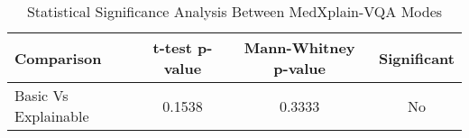 
\begin{table}[htbp]
\centering
\caption{Statistical Significance Analysis Between MedXplain-VQA Modes}
\label{tab:statistical_analysis}
\begin{tabular}{lccc}
\toprule
\textbf{Comparison} & \textbf{t-test p-value} & \textbf{Mann-Whitney p-value} & \textbf{Significant} \\
\midrule
Basic Vs Explainable & 0.1538 & 0.3333 & No \\
\bottomrule
\end{tabular}
\end{table}
